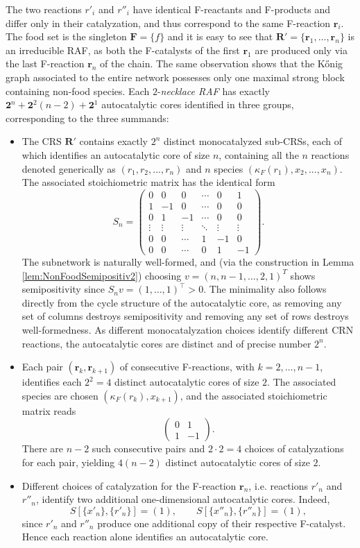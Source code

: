 \documentclass[pdflatex]{sn-jnl}
\theoremstyle{thmstyleone}%
\theoremstyle{examplesty}%
\theoremstyle{thmstylethree}%
\newcommand{\food}{\ensuremath{\mathbf{F}}}
\newcommand{\fr}[0]{\mathbf{r}}
\newcommand{\RAF}[0]{\mathbf{R}'}
\newcommand{\cat}{\kappa_F}
\begin{document}
The two reactions $r'_i$ and $r''_i$ have identical F-reactants and
F-products and differ only in their catalyzation, and thus correspond to
the same F-reaction $\fr_i$. The food set is the singleton $\food=\{f\}$ and it is easy to see that $\RAF=\{\fr_1,\ldots,\fr_n\}$
is an irreducible RAF, as both the F-catalysts of the first $\fr_1$ are produced only via the last F-reaction $\fr_n$ of the chain. 
The same observation shows that the K\H{o}nig graph associated to the entire network possesses only one maximal strong 
block containing non-food species. Each $2$-\emph{necklace RAF} has exactly $\mathbf{2}^n+\mathbf{2}^2(n-2)+\mathbf{2}^1$ 
autocatalytic cores identified in three groups, corresponding to the
three summands:
\begin{itemize}
\item The CRS $\RAF$ contains exactly $2^n$ distinct monocatalyzed
sub-CRSs, each of which identifies an autocatalytic core of size $n$,
containing all the $n$ reactions denoted generically as $(r_1,r_2,...,r_n)$ and $n$ species $(\cat(r_1),x_2,...,x_n)$. The associated stoichiometric matrix has the identical form
\[S_n=
  \begin{pmatrix}
    0 & 0 & 0 & \cdots & 0 & 1\\
    1 & -1 & 0 & \cdots & 0 & 0\\
    0 & 1 & -1 & \cdots & 0 & 0\\
    \vdots & \vdots & \vdots & \ddots & \vdots & \vdots\\
    0 & 0 & \cdots & 1 & -1 & 0\\
    0 & 0 & \cdots & 0 & 1 & -1
  \end{pmatrix}.
\]
The subnetwork is naturally well-formed, and (via the construction in Lemma \ref{lem:NonFoodSemipositiv2}) choosing $v=(n,n-1,\ldots,2,1)^T$ shows semipositivity since $
  S_nv=(1,\ldots,1)^\top>0$. The minimality also follows directly from the cycle structure of the autocatalytic core, as removing any set of columns destroys semipositivity and 
  removing any set of rows destroys well-formedness. As different monocatalyzation choices identify different CRN reactions, the autocatalytic cores are distinct and of precise 
  number $2^n$.
\item Each pair $(\fr_k,\fr_{k+1})$ of consecutive F-reactions, with $k=2,\ldots,n-1$, identifies each $2^2=4$ distinct
autocatalytic cores of size $2$. The associated species are chosen $(\cat(r_k),x_{k+1})$, and the associated stoichiometric matrix reads
\[ \begin{pmatrix}
    0 & 1\\
    1 & -1
  \end{pmatrix}.
\]
There are $n-2$ such consecutive pairs and $2\cdot2=4$ choices of catalyzations 
for each pair, yielding $4(n-2)$ distinct autocatalytic cores of size $2$. 
\item Different choices of catalyzation for the F-reaction $\fr_n$,
i.e. reactions $r'_n$ and $r''_n$, identify two additional
one-dimensional autocatalytic cores. Indeed,
\[
  S[\{x'_n\},\{r'_n\}]=(1),
  \qquad
  S[\{x''_n\},\{r''_n\}]=(1),
\]
since $r'_n$ and $r''_n$ produce one additional copy of their
respective F-catalyst. Hence each reaction alone identifies an
autocatalytic core.

\end{itemize}
\end{document}
